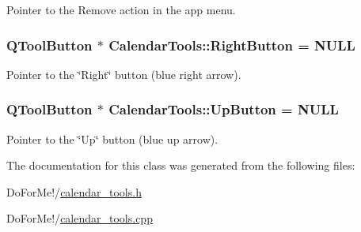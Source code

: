 Pointer to the Remove action in the app menu. 

\hypertarget{struct_calendar_tools_a59954d8547d3129599bd876421dfcc2b}{
\subsubsection[{Right\-Button}]{\setlength{\rightskip}{0pt plus 5cm}Q\-Tool\-Button $\ast$ Calendar\-Tools\-::\-Right\-Button = N\-U\-L\-L\hspace{0.3cm}{\ttfamily [static]}}}\label{struct_calendar_tools_a59954d8547d3129599bd876421dfcc2b}


Pointer to the \char`\"{}\-Right\char`\"{} button (blue right arrow). 

\hypertarget{struct_calendar_tools_a63d3c0ee2fe25cad5f813d23b7dd2a16}{
\subsubsection[{Up\-Button}]{\setlength{\rightskip}{0pt plus 5cm}Q\-Tool\-Button $\ast$ Calendar\-Tools\-::\-Up\-Button = N\-U\-L\-L\hspace{0.3cm}{\ttfamily [static]}}}\label{struct_calendar_tools_a63d3c0ee2fe25cad5f813d23b7dd2a16}


Pointer to the \char`\"{}\-Up\char`\"{} button (blue up arrow). 



The documentation for this class was generated from the following files\-:\begin{DoxyCompactItemize}
\item 
Do\-For\-Me!/\hyperlink{calendar__tools_8h}{calendar\-\_\-tools.\-h}\item 
Do\-For\-Me!/\hyperlink{calendar__tools_8cpp}{calendar\-\_\-tools.\-cpp}\end{DoxyCompactItemize}
